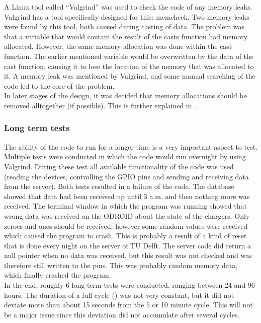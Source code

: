 A Linux tool called ``Valgrind'' \cite{valgrind} was used to check the code of any memory leaks. Valgrind has a tool specifically designed for this: memcheck. Two memory leaks were found by this tool, both caused during casting of data. The problem was that a variable that would contain the result of the casts function had memory allocated. However, the same memory allocation was done within the cast function. The earlier mentioned variable would be overwritten by the data of the cast function, causing it to lose the location of the memory that was allocated to it. A memory leak was mentioned by Valgrind, and some manual searching of the code led to the core of the problem.\\

In later stages of the design, it was decided that memory allocations should be removed alltogether (if possible). This is further explained in .

\subsubsection{Long term tests}
The ability of the code to run for a longer time is a very important aspect to test. Multiple tests were conducted in which the code would run overnight by using Valgrind. During these test all available functionality of the code was used (reading the devices, controlling the GPIO pins and sending and receiving data from the server). Both tests resulted in a failure of the code. The database showed that data had been received up until 3 a.m. and then nothing more was received. The terminal window in which the program was running showed that wrong data was received on the ODROID about the state of the chargers. Only zeroes and ones should be received, however some random values were received which caused the program to crash. This is probably a result of a kind of reset that is done every night on the server of TU Delft. The server code did return a null pointer when no data was received, but this result was not checked and was therefore still written to the pins. This was probably random memory data, which finally crashed the program.\\

In the end, roughly 6 long-term tests were conducted, ranging between 24 and 96 hours. The duration of a full cycle () was not very constant, but it did not deviate more than about 15 seconds from the 5 or 10 minute cycle. This will not be a major issue since this deviation did not accumulate after several cycles.\\


